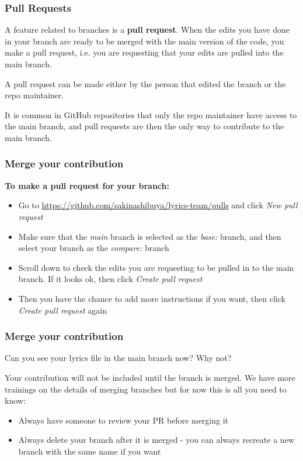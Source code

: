 \documentclass[aspectratio=169]{beamer} %
\newcommand{\trainingURL}[1]{{\color{blue}\url{#1}}}
\newcommand{\traininerUsername}{sakinashibuya}
\newcommand{\repoName}{\traininerUsername/lyrics-team}
\newcommand{\trainingRepoURL}[1]{\trainingURL{https://github.com/\repoName #1}}
\begin{document}
\begin{frame}
\frametitle{Pull Requests}

	A feature related to branches is a \textbf{pull request}.
	When the edits you have done in your branch
	are ready to be merged with the main version of the code,
	you make a pull request, i.e. you are requesting that
	your edits are pulled into the main branch.


	A pull request can be made either by the person that edited the branch or the repo maintainer.

	It is common in GitHub repositories that only the repo maintainer have access to the main branch, and pull requests are then the only way to contribute to the main branch.


\end{frame}

\begin{frame}
\frametitle{Merge your contribution}

	\textbf{To make a pull request for your branch:}
	\begin{itemize}
		\item Go to \trainingRepoURL{/pulls} and click \textit{New pull request}
		\item Make sure that the \textit{main} branch is selected as the \textit{base:} branch, and then select your branch as the \textit{compare:} branch
		\item Scroll down to check the edits you are requesting to be pulled in to the main branch. If it looks ok, then click \textit{Create pull request}
		\item Then you have the chance to add more instructions if you want, then click \textit{Create pull request} again
	\end{itemize}
\end{frame}

\begin{frame}
\frametitle{Merge your contribution}

Can you see your lyrics file in the main branch now? Why not?

\vspace{.5cm}

Your contribution will not be included until the branch is merged. We have more trainings on the details of merging branches but for now this is all you need to know:

	\begin{itemize}
		\item Always have someone to review your PR before merging it
		\item Always delete your branch after it is merged - you can always recreate a new branch with the same name if you want
	\end{itemize}

\end{frame}
\end{document}
